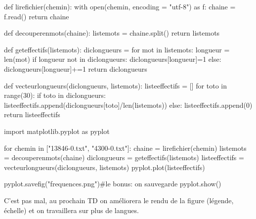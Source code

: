 \begin{python} def lirefichier(chemin): with open(chemin, encoding
= "utf-8") as f: chaine = f.read() return chaine

def decouperenmots(chaine): listemots = chaine.split() return listemots

def geteffectifs(listemots): diclongueurs = {} for mot in listemots:
longueur = len(mot) if longueur not in diclongueurs: diclongueurs{[}longueur{]}=1
else: diclongueurs{[}longueur{]}+=1 return diclongueurs

def vecteurlongueurs(diclongueurs, listemots): listeeffectifs = {[}{]}
for toto in range(30): if toto in diclongueurs: listeeffectifs.append(diclongueurs{[}toto{]}/len(listemots))
else: listeeffectifs.append(0) return listeeffectifs

import matplotlib.pyplot as pyplot

for chemin in {[}"13846-0.txt", "4300-0.txt"{]}: chaine = lirefichier(chemin)
listemots = decouperenmots(chaine) diclongueurs = geteffectifs(listemots)
listeeffectifs = vecteurlongueurs(diclongueurs, listemots) pyplot.plot(listeeffectifs)

pyplot.savefig("frequences.png")\#le bonus: on sauvegarde pyplot.show()

\end{python}

C'est pas mal, au prochain TD on améliorera le rendu de la figure
(légende, échelle) et on travaillera sur plus de langues. 
